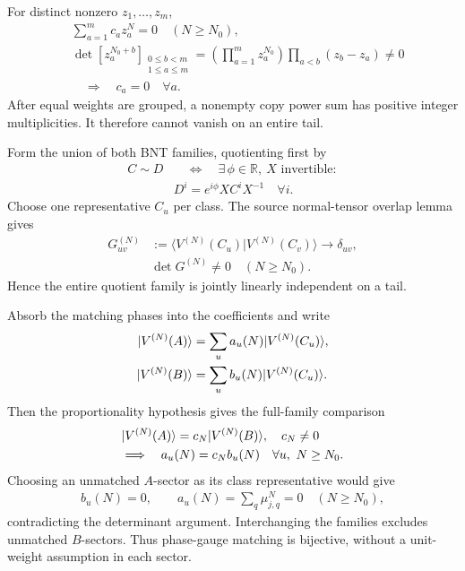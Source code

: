 \documentclass[aps,pra,reprint,nofootinbib,onecolumn]{revtex4-2}
\begin{document}
For distinct nonzero $z_1,\ldots,z_m$,
\begin{align}
	 & \sum_{a=1}^mc_az_a^N=0\quad(N\geq N_0),\nonumber        \\
	 & \det[z_a^{N_0+b}]_{\substack{0\leq b<m\\1\leq a\leq m}}
	=\left(\prod_{a=1}^mz_a^{N_0}\right)
	\prod_{a<b}(z_b-z_a)\ne0\nonumber                          \\
	 & \quad\Longrightarrow\quad c_a=0\quad\forall a.
	\label{eq:vandermonde}
\end{align}
After equal weights are grouped, a nonempty copy power sum has
positive integer multiplicities. It therefore cannot vanish on
an entire tail.

Form the union of both BNT families, quotienting first by
\begin{align}
	C\sim D
	 & \quad\Longleftrightarrow\quad
	\exists\,\phi\in\mathbb R,\ X\text{ invertible}:\nonumber \\
	 & D^i=e^{i\phi}XC^iX^{-1}\quad\forall i.
	\label{eq:bnt-equivalence}
\end{align}
Choose one representative $C_u$ per class. The source normal-tensor
overlap lemma gives
\begin{align}
	G_{uv}^{(N)}
	 & :=\langle V^{(N)}(C_u)|V^{(N)}(C_v)\rangle
	\longrightarrow\delta_{uv},\nonumber          \\
	 & \det G^{(N)}\ne0\quad(N\geq N_0).
	\label{eq:gram-matrix}
\end{align}
Hence the entire quotient family is jointly linearly independent
on a tail.

Absorb the matching phases into the coefficients and write
\begin{align}
	\lvert V^{(N)}(A)\rangle & =\sum_u a_u(N)\lvert V^{(N)}(C_u)\rangle,\nonumber \\
	\lvert V^{(N)}(B)\rangle & =\sum_u b_u(N)\lvert V^{(N)}(C_u)\rangle.
	\label{eq:mpv-expansion}
\end{align}
Then the proportionality hypothesis gives the full-family comparison
\begin{align}
	 & \lvert V^{(N)}(A)\rangle=c_N\lvert V^{(N)}(B)\rangle,\quad c_N\ne0\nonumber \\
	 & \Longrightarrow\quad
	a_u(N)=c_Nb_u(N)\quad\forall u,\ N\geq N_0.
	\label{eq:proportional-expansion}
\end{align}
Choosing an unmatched $A$-sector as its class representative would give
\begin{align}
	b_u(N)=0,\qquad
	a_u(N)=\sum_q\mu_{j,q}^N=0\quad(N\geq N_0),
	\label{eq:unmatched-sector}
\end{align}
contradicting the determinant argument. Interchanging the families
excludes unmatched $B$-sectors. Thus phase-gauge matching is
bijective, without a unit-weight assumption in each sector.
\end{document}
